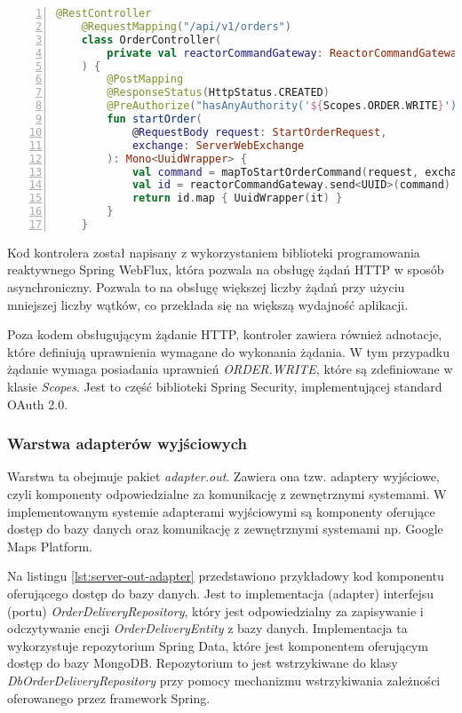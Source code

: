 \begin{lstlisting}[caption={Przykładowy kod kontrolera REST API},label={lst:server-in-adapter},captionpos=b,language=Kotlin,numbers=left]
    @RestController
    @RequestMapping("/api/v1/orders")
    class OrderController(
        private val reactorCommandGateway: ReactorCommandGateway
    ) {
        @PostMapping
        @ResponseStatus(HttpStatus.CREATED)
        @PreAuthorize("hasAnyAuthority('${Scopes.ORDER.WRITE}')")
        fun startOrder(
            @RequestBody request: StartOrderRequest,
            exchange: ServerWebExchange
        ): Mono<UuidWrapper> {
            val command = mapToStartOrderCommand(request, exchange)
            val id = reactorCommandGateway.send<UUID>(command)
            return id.map { UuidWrapper(it) }
        }
    }
\end{lstlisting}

Kod kontrolera został napisany z wykorzystaniem biblioteki programowania reaktywnego Spring WebFlux, która pozwala na obsługę żądań HTTP w sposób asynchroniczny. Pozwala to na obsługę większej liczby żądań przy użyciu mniejszej liczby wątków, co przekłada się na większą wydajność aplikacji.

Poza kodem obsługującym żądanie HTTP, kontroler zawiera również adnotacje, które definiują uprawnienia wymagane do wykonania żądania. W tym przypadku żądanie wymaga posiadania uprawnień \textit{ORDER.WRITE}, które są zdefiniowane w klasie \textit{Scopes}. Jest to część biblioteki Spring Security, implementującej standard OAuth 2.0.

\subsubsection{Warstwa adapterów wyjściowych} 

Warstwa ta obejmuje pakiet \textit{adapter.out}. Zawiera ona tzw. adaptery wyjściowe, czyli komponenty odpowiedzialne za komunikację z zewnętrznymi systemami. W implementowanym systemie adapterami wyjściowymi są komponenty oferujące dostęp do bazy danych oraz komunikację z zewnętrznymi systemami np. Google Maps Platform.

Na listingu \ref{lst:server-out-adapter} przedstawiono przykładowy kod komponentu oferującego dostęp do bazy danych. Jest to implementacja (adapter) interfejsu (portu) \textit{OrderDeliveryRepository}, który jest odpowiedzialny za zapisywanie i odczytywanie encji \textit{OrderDeliveryEntity} z bazy danych. Implementacja ta wykorzystuje repozytorium Spring Data, które jest komponentem oferującym dostęp do bazy MongoDB. Repozytorium to jest wstrzykiwane do klasy \textit{DbOrderDeliveryRepository} przy pomocy mechanizmu wstrzykiwania zależności oferowanego przez framework Spring. 

